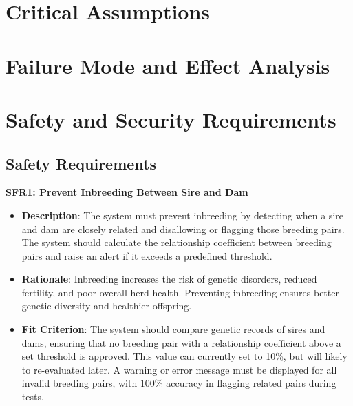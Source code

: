 \documentclass{article}
\begin{document}
\section{Critical Assumptions}


\section{Failure Mode and Effect Analysis}


\section{Safety and Security Requirements}

\subsection{Safety Requirements}

\textbf{SFR1: Prevent Inbreeding Between Sire and Dam} 
\begin{itemize}
    \item \textbf{Description}: The system must prevent inbreeding by detecting 
    when a sire and dam are closely related and disallowing or flagging those 
    breeding pairs. The system should calculate the relationship coefficient 
    between breeding pairs and raise an alert if it exceeds a predefined 
    threshold.
    \item \textbf{Rationale}: Inbreeding increases the risk of genetic 
    disorders, reduced fertility, and poor overall herd health. Preventing 
    inbreeding ensures better genetic diversity and healthier offspring.
    \item \textbf{Fit Criterion}: The system should compare genetic records of 
    sires and dams, ensuring that no breeding pair with a relationship 
    coefficient above a set threshold is approved. This value can currently set 
    to 10\%, but will likely to re-evaluated later. A warning or error message 
    must be displayed for all invalid breeding pairs, with 100\% accuracy in 
    flagging related pairs during tests.
\end{itemize}
\vspace{10pt}
\end{document}
